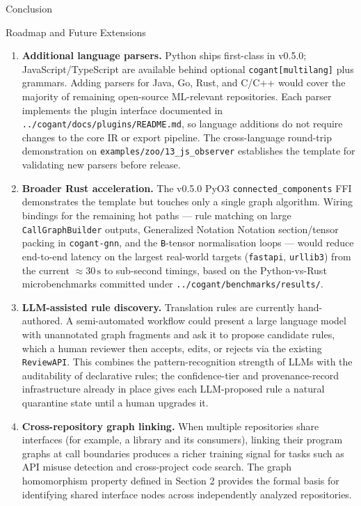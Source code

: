 \documentclass[
  ignorenonframetext,
]{beamer}
\begin{document}
\begin{frame}[fragile]{Conclusion}
\begin{block}{Roadmap and Future Extensions}
\begin{enumerate}
\item
  \textbf{Additional language parsers.} Python ships first-class in
  v0.5.0; JavaScript/TypeScript are available behind optional
  \texttt{cogant{[}multilang{]}} plus grammars. Adding parsers for Java,
  Go, Rust, and C/C++ would cover the majority of remaining open-source
  ML-relevant repositories. Each parser implements the plugin interface
  documented in \texttt{../cogant/docs/plugins/README.md}, so language
  additions do not require changes to the core IR or export pipeline.
  The cross-language round-trip demonstration on
  \texttt{examples/zoo/13\_js\_observer} establishes the template for
  validating new parsers before release.
\item
  \textbf{Broader Rust acceleration.} The v0.5.0 PyO3
  \texttt{connected\_components} FFI demonstrates the template but
  touches only a single graph algorithm. Wiring bindings for the
  remaining hot paths --- rule matching on large
  \texttt{CallGraphBuilder} outputs, Generalized Notation Notation
  section/tensor packing in \texttt{cogant-gnn}, and the
  \texttt{B}-tensor normalisation loops --- would reduce end-to-end
  latency on the largest real-world targets (\texttt{fastapi},
  \texttt{urllib3}) from the current \(\approx 30\,\text{s}\) to
  sub-second timings, based on the Python-vs-Rust microbenchmarks
  committed under \texttt{../cogant/benchmarks/results/}.
\item
  \textbf{LLM-assisted rule discovery.} Translation rules are currently
  hand-authored. A semi-automated workflow could present a large
  language model with unannotated graph fragments and ask it to propose
  candidate rules, which a human reviewer then accepts, edits, or
  rejects via the existing \texttt{ReviewAPI}. This combines the
  pattern-recognition strength of LLMs with the auditability of
  declarative rules; the confidence-tier and provenance-record
  infrastructure already in place gives each LLM-proposed rule a natural
  quarantine state until a human upgrades it.
\item
  \textbf{Cross-repository graph linking.} When multiple repositories
  share interfaces (for example, a library and its consumers), linking
  their program graphs at call boundaries produces a richer training
  signal for tasks such as API misuse detection and cross-project code
  search. The graph homomorphism property defined in Section 2 provides
  the formal basis for identifying shared interface nodes across
  independently analyzed repositories.

\end{enumerate}
\end{block}
\end{frame}
\end{document}
